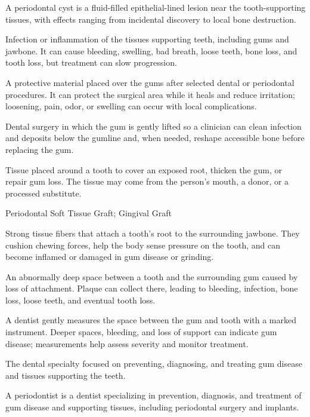  A periodontal cyst is a fluid-filled epithelial-lined lesion near the tooth-supporting tissues, with effects ranging from incidental discovery to local bone destruction.

 Infection or inflammation of the tissues supporting teeth, including gums and jawbone. It can cause bleeding, swelling, bad breath, loose teeth, bone loss, and tooth loss, but treatment can slow progression.

 A protective material placed over the gums after selected dental or periodontal procedures. It can protect the surgical area while it heals and reduce irritation; loosening, pain, odor, or swelling can occur with local complications.

 Dental surgery in which the gum is gently lifted so a clinician can clean infection and deposits below the gumline and, when needed, reshape accessible bone before replacing the gum.

 Tissue placed around a tooth to cover an exposed root, thicken the gum, or repair gum loss. The tissue may come from the person’s mouth, a donor, or a processed substitute.

\synonyms
Periodontal Soft Tissue Graft; Gingival Graft

 Strong tissue fibers that attach a tooth’s root to the surrounding jawbone. They cushion chewing forces, help the body sense pressure on the tooth, and can become inflamed or damaged in gum disease or grinding.

 An abnormally deep space between a tooth and the surrounding gum caused by loss of attachment. Plaque can collect there, leading to bleeding, infection, bone loss, loose teeth, and eventual tooth loss.

 A dentist gently measures the space between the gum and tooth with a marked instrument. Deeper spaces, bleeding, and loss of support can indicate gum disease; measurements help assess severity and monitor treatment.

 The dental specialty focused on preventing, diagnosing, and treating gum disease and tissues supporting the teeth.

 A periodontist is a dentist specializing in prevention, diagnosis, and treatment of gum disease and supporting tissues, including periodontal surgery and implants.

